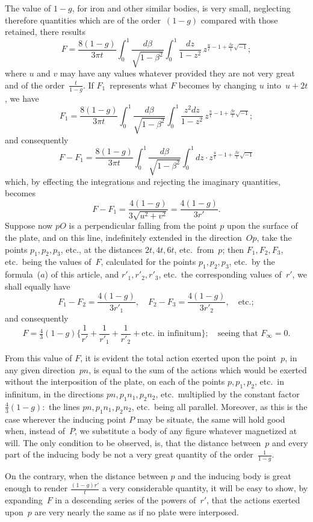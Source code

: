 \documentclass[12pt,notitlepage]{amsart}
\begin{document}
The value of $1-g$, for iron and other similar bodies, is very small,
neglecting therefore quantities which are of the order~$(1-g)$
compared with those
retained, there results
\[
\tag{$a$.}
F=\frac{8(1-g)}{3\pi t}
\int_0^1\frac{d\beta}{\sqrt{1-\beta^2}}
\int_0^1\frac{dz}{1-z^2}\,z^{\frac ut-1+\frac{\beta v}{t}\sqrt{-1}};
\]
where $u$ and $v$ may have any values whatever provided they are not very
great and of the order~$\frac{t}{1-g}$.
If $F_1$~represents what $F$ becomes by changing
$u$ into~$u+2t$, we have
\[
F_1=\frac{8(1-g)}{3\pi t}
\int_0^1\frac{d\beta}{\sqrt{1-\beta^2}}
\int_0^1\frac{z^2dz}{1-z^2}\,z^{\frac ut-1+\frac{\beta v}{t}\sqrt{-1}};
\]
and consequently
\[
F-F_1=\frac{8(1-g)}{3\pi t}
\int_0^1\frac{d\beta}{\sqrt{1-\beta^2}}
\int_0^1dz\cdot z^{\frac ut-1+\frac{\beta v}{t}\sqrt{-1}}
\]
which, by effecting the integrations and rejecting the imaginary quantities,
becomes
\[
F-F_1=\frac{4(1-g)}{3\sqrt{u^2+v^2}}=\frac{4(1-g)}{3r'}.
\]
Suppose now $pO$ is a perpendicular falling from the point $p$ upon the surface
of the plate, and on this line, indefinitely extended in the direction~$Op$,
take
the points $p_1,p_2,p_3$, etc., at the distances $2t,4t,6t$,
etc.\ from~$p$; then
$F_1,F_2,F_3$, etc.\ being the values of~$F$,
calculated for the points $p_1,p_2,p_3$, etc.\ by
the formula~($a$) of this article,
and $r'_1,r'_2,r'_3$, etc.\ the corresponding
values of~$r'$, we shall equally have
\[
F_1-F_2=\frac{4(1-g)}{3r'_1},\quad
F_2-F_3=\frac{4(1-g)}{3r'_2},\quad\text{etc.};
\]
and consequently
\[
F=\tfrac43(1-g)
\biggl\{ \frac{1}{r'}+\frac{1}{r'_1}+\frac{1}{r'_2}
+\text{etc. in infinitum} \biggr\};
\quad\text{seeing that $F_\infty=0$.}
\]

From this value of $F$, it is evident the total action exerted upon the
point~$p$, in any given direction~$pn$, is equal to the sum of the actions which
would be exerted without the interposition of the plate, on each of the points
$p,p_1,p_2$, etc.\ in infinitum,
in the directions $pn,p_1n_1,p_2n_2$, etc.\ multiplied
by the constant factor~$\frac43(1-g):$
the lines $pn,p_1n_1,p_2n_2$, etc.\ being all
parallel. Moreover, as this is the case wherever the inducing point $P$ may
be situate, the same will hold good when, instead of~$P$, we substitute a body
of any figure whatever magnetized at will. The only condition to be observed,
is, that the distance between~$p$ and every part of the inducing body be not
a very great quantity of the order~$\frac{1}{1-g}$.

On the contrary, when the distance between $p$ and the inducing body
is great enough to render $\frac{(1-g)r'}{t}$
a very considerable quantity, it will be
easy to show, by expanding~$F$ in a descending series of the powers of~$r'$,
that the actions exerted upon~$p$ are very nearly the same as if no plate
were interposed.
\end{document}
